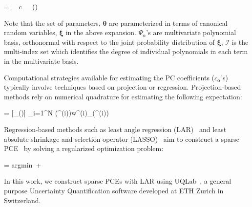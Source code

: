 \be
{} = \sum_{\alpha\in{}} c_{\alpha}\Psi_{\alpha}(\bm{\xi(\theta)}) 
\ee

Note that the set of parameters, $\bm{\theta}$ are parameterized in terms of canonical random
variables, $\bm{\xi}$ in the above expansion. $\Psi_{\alpha}$'s are multivariate polynomial
basis, orthonormal with respect to the joint probability distribution of $\bm{\xi}$, $\mathcal{I}$
is the multi-index set which identifies the degree of individual polynomials in each term in the
multivariate basis.

Computational strategies available for estimating the PC coefficients ($c_\alpha$'s) typically involve
techniques based on projection or regression. Projection-based methods rely on numerical
quadrature for estimating the following expectation:

\be
{} = [\Psi_\alpha(\bm{\xi})\cdot{}]
\approx
\sum_{i=1}^{N} (\bm{\theta}^{(i)})w^{(i)}\Psi_\alpha(\bm{\xi}^{(i)})
\ee

Regression-based methods such as least angle regression (LAR)~\cite{Efron:2004} and least absolute shrinkage
and selection operator (LASSO)~\cite{Tibshirani:1996} aim to construct a sparse PCE~\cite{Blatman:2008}
by solving a regularized optimization problem:

\be
{} = \mbox{argmin}~  + \lambda{}
\ee

In this work, we construct sparse PCEs with LAR using UQLab~\cite{Marelli:2014},
a general purpose Uncertainty Quantification software developed at ETH Zurich in Switzerland.


















